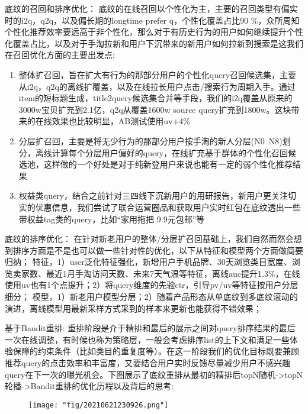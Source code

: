 底纹的召回和排序优化： 底纹的在线召回以个性化为主，主要的召回类型有偏实时的i2q，q2q，以及偏长期的longtime prefer q，个性化覆盖占比90
\%，众所周知个性化推荐效率要远高于非个性化，那么对于有历史行为的用户如何继续提升个性化覆盖占比，以及对于手淘拉新和用户下沉带来的新用户如何拉新到搜索是这我们在召回优化方面的主要出发点; 
\begin{enumerate}

	\item 整体扩召回，旨在扩大有行为的那部分用户的个性化query召回候选集，主要从i2q，q2q的离线扩覆盖，以及在线拉长用户点击/搜索行为周期入手。通过item的短标题生成，title2query候选集合并等手段，我们的i2q覆盖从原来的3000w宝贝扩充到2.1亿，q2q从覆盖1600w source query扩充到1800w。这块带来的在线效果也比较明显，AB测试使用uv+4\%

	\item 分层扩召回，主要是将无少行为的那部分用户按手淘的新人分层(N0~N8)划分，离线计算每个分层用户偏好的query，在线扩充基于群体的个性化召回候选池，这样做的一个好处是对于纯新登用户来说也能有一定的弱个性化推荐结果

	\item 权益类query，结合之前针对三四线下沉新用户的用研报告，新用户更关注切实的优惠信息，我们尝试了联合运营圈品和获取用户实时红包在底纹透出一些带权益tag类的query，比如“家用拖把 9.9元包邮”等

\end{enumerate}

底纹的排序优化： 在针对新老用户的整体/分层扩召回基础上，我们自然而然会想到排序方面是不是也可以做一些针对性的优化，以下从特征和模型两个方面做简要归纳； 特征，1）user泛化特征强化，新增用户手机品牌、30天浏览类目宽度、浏览卖家数、最近1月手淘访问天数、未来7天气温等特征，离线auc提升1.3\%，在线使用uv也有1个点提升；2）将query维度的先验ctr，引导pv/uv等特征按用户分层细分；
模型，1）新老用户模型分层；2）随着产品形态从单底纹到多底纹滚动的演进，离线模型用最新采样方式采到的样本来更新也能获得不错效果；

基于Bandit重排: 重排阶段是介于精排和最后的展示之间对query排序结果的最后一次在线调整，有时候也称为策略层，一般会考虑排序list的上下文和满足一些体验保障的约束条件（比如类目的重复度等）。在这一阶段我们的优化目标既要兼顾推荐query的点击效率和丰富度，又要结合用户实时反馈尽量减少用户不感兴趣query在下一次的曝光机会。下图展示了底纹重排从最初的精排后topN随机->topN轮播->Bandit重排的优化历程以及背后的思考:

\begin{figure}[!h]
	\centering
	\texttt{[image: "fig/20210621230926.png"]}
	\caption{}
	\label{fig:20210621230926}
\end{figure}


